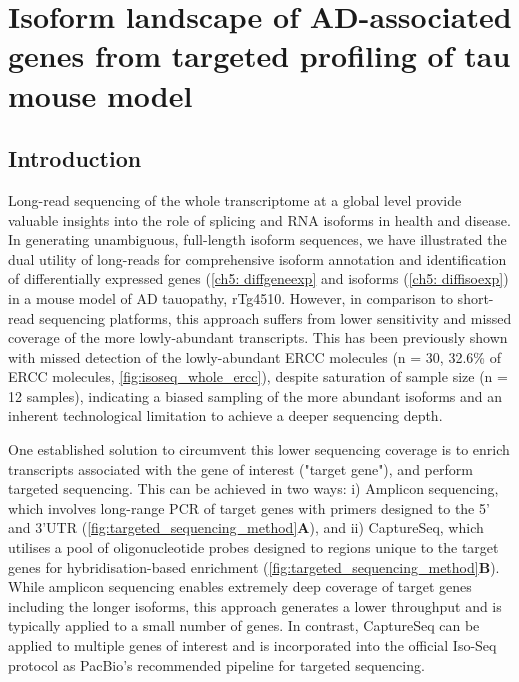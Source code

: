 \chapter{Isoform landscape of AD-associated genes from targeted profiling of tau mouse model}\label{ch: targeted_transcriptome}
\label{targetedmousetranscriptome}


\section{Introduction}
Long-read sequencing of the whole transcriptome at a global level provide valuable insights into the role of splicing and RNA isoforms in health and disease. In generating unambiguous, full-length isoform sequences, we have illustrated the dual utility of long-reads for comprehensive isoform annotation and identification of differentially expressed genes (\cref{ch5: diffgeneexp} and isoforms (\cref{ch5: diffisoexp}) in a mouse model of AD tauopathy, rTg4510. However, in comparison to short-read sequencing platforms, this approach suffers from lower sensitivity and missed coverage of the more lowly-abundant transcripts\cite{Stark2019}. This has been previously shown with missed detection of the lowly-abundant ERCC molecules (n = 30, 32.6\% of ERCC molecules, \cref{fig:isoseq_whole_ercc}), despite saturation of sample size (n = 12 samples), indicating a biased sampling of the more abundant isoforms and an inherent technological limitation to achieve a deeper sequencing depth. 

One established solution to circumvent this lower sequencing coverage is to enrich transcripts associated with the gene of interest ("target gene"), and perform targeted sequencing. This can be achieved in two ways: i) Amplicon sequencing, which involves long-range PCR of target genes with primers designed to the 5' and 3'UTR (\cref{fig:targeted_sequencing_method}\textbf{A}), and ii) CaptureSeq, which utilises a pool of oligonucleotide probes designed to regions unique to the target genes for hybridisation-based enrichment (\cref{fig:targeted_sequencing_method}\textbf{B}). While amplicon sequencing enables extremely deep coverage of target genes including the longer isoforms, this approach generates a lower throughput and is typically applied to a small number of genes. In contrast, CaptureSeq can be applied to multiple genes of interest and is incorporated into the official Iso-Seq protocol as PacBio's recommended pipeline for targeted sequencing\cite{Tseng2019}.  



